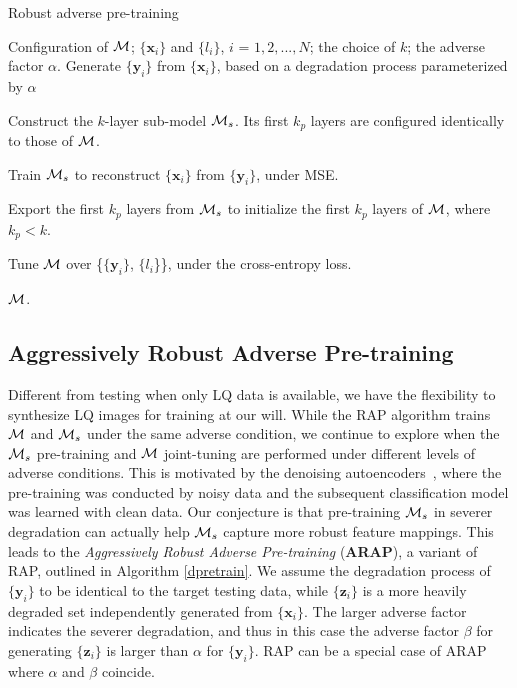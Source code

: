 \documentclass[10pt,twocolumn,twoside]{IEEEtran} %
\begin{document}
\begin{algorithm}[h]
	\caption{Robust adverse pre-training}
	\label{pretrain}
	\begin{algorithmic}[1]
		\REQUIRE Configuration of ${\mathcal{M}}$; $\{\mathbf{x}_i\}$ and $\{l_i\}$, $i$ = $1, 2,..., N$; the choice of $k$; the adverse factor $\alpha$.
		\STATE Generate $\{\mathbf{y}_i\}$ from $\{\mathbf{x}_i\}$, based on a degradation process parameterized by $\alpha$
		
		\STATE Construct the $k$-layer sub-model ${\mathcal{M}}_s$. Its first $k_p$ layers are configured identically to those of ${\mathcal{M}}$.
		
		\STATE Train ${\mathcal{M}}_s$ to reconstruct $\{\mathbf{x}_i\}$ from $\{\mathbf{y}_i\}$, under MSE.
		
		\STATE Export the first $k_p$ layers from ${\mathcal{M}}_s$ to initialize  the first $k_p$ layers of ${\mathcal{M}}$, where $k_p < k$.
		
		\STATE Tune ${\mathcal{M}}$ over \{$\{\mathbf{y}_i\}$, $\{l_i$\}\}, under the cross-entropy loss.
		
		\ENSURE ${\mathcal{M}}$.
	\end{algorithmic}
\end{algorithm}\subsection{Aggressively Robust Adverse Pre-training}
Different from testing when only LQ data is available, we have the flexibility to synthesize LQ images for training at our will. 
While the RAP algorithm  trains ${\mathcal{M}}$ and ${\mathcal{M}}_s$ under the same adverse condition, 
we continue to explore when the ${\mathcal{M}}_s$ pre-training and ${\mathcal{M}}$ joint-tuning are performed under different levels of adverse conditions. 
This is motivated by the denoising autoencoders~\cite{vincent2010stacked}, where the pre-training was conducted by noisy data and the subsequent classification model was learned with clean data. Our conjecture is that pre-training ${\mathcal{M}}_s$ in severer degradation can actually help ${\mathcal{M}}_s$ capture more robust feature mappings. 
This leads to the \textit{Aggressively Robust Adverse Pre-training} (\textbf{ARAP}), a variant of RAP, outlined in Algorithm \ref{dpretrain}. We assume the degradation process of $\{\mathbf{y}_i\}$ to be identical to the target testing data, while $\{\mathbf{z}_i\}$ is a more heavily degraded set independently generated from $\{\mathbf{x}_i\}$. 
The larger adverse factor indicates the severer degradation, 
and thus in this case the adverse factor $\beta$ for generating $\{\mathbf{z}_i\}$ is larger than $\alpha$ for $\{\mathbf{y}_i\}$. 
RAP can be a special case of ARAP where $\alpha$ and $\beta$ coincide. 
\end{document}
